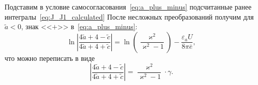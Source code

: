 \documentclass[a4paper, 12pt]{extarticle}
\def \ve {\varepsilon}
\def \vk {\varkappa}
\def \tz {\tilde{z}}
\def \ta {\tilde{a}}
\def \tc {\tilde{c}}
\begin{document}

Подставим в условие самосогласования~\eqref{eq:a_plus_minus} подсчитанные ранее интегралы~\eqref{eq:J_J1_calculated}
После несложных преобразований получим для $\ta < 0$, знак <<$+$>> в~\eqref{eq:a_plus_minus}:
\begin{equation}
	\ln{\left| \frac{4\ta+4-\tc}{4\ta+4+\tc} \right|} = \ln{\left( \frac{\vk^2}{\vk^2 - 1}\right)} - \frac{\ve_a U}{8\pi \bar{e}},
\end{equation}
что можно переписать в виде
\begin{equation}
	\left| \frac{4\ta+4-\tc}{4\ta+4+\tc}  \right| = \frac{\vk^2}{\vk^2 - 1}\cdot\gamma.\label{eq:gammaSig1}
\end{equation}
\end{document}
